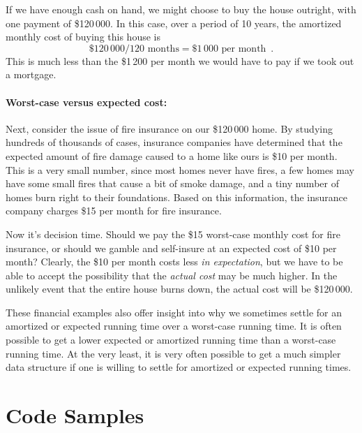 \documentclass[10pt]{book}
\theoremstyle{plain}
\theoremstyle{definition}
\begin{document}
If we have enough cash on hand, we might choose to buy the house outright,
with one payment of \$120\,000.  In this case, over a period of 10 years,
the amortized monthly cost of buying this house is
\[
   \$120\,000 / 120\text{ months} = \$1\,000\text{ per month} \enspace .
\]
This is much less than the \$1\,200 per month we would have to pay if
we took out a mortgage.

\paragraph{Worst-case versus expected cost:}
%
Next, consider the issue of fire insurance on our \$120\,000 home.
By studying hundreds of thousands of cases, insurance companies have
determined that the expected amount of fire damage caused to a home
like ours is \$10 per month.  This is a very small number, since most
homes never have fires, a few homes may have some small fires that
cause a bit of smoke damage, and a tiny number of homes burn right to
their foundations.  Based on this information, the insurance company
charges \$15 per month for fire insurance.

Now it's decision time. Should we pay the \$15 worst-case monthly cost
for fire insurance, or should we gamble and self-insure at an expected
cost of \$10 per month?  Clearly, the \$10 per month costs less \emph{in
expectation}, but we have to be able to accept the possibility that
the \emph{actual cost} may be much higher.  In the unlikely event that the
entire house burns down, the actual cost will be \$120\,000.

These financial examples also offer insight into why we sometimes settle
for an amortized or expected running time over a worst-case running time.
It is often possible to get a lower expected or amortized running time
than a worst-case running time. At the very least, it is very often possible
to get a much simpler data structure if one is willing to settle for
amortized or expected running times.

\section{Code Samples}
\end{document}
